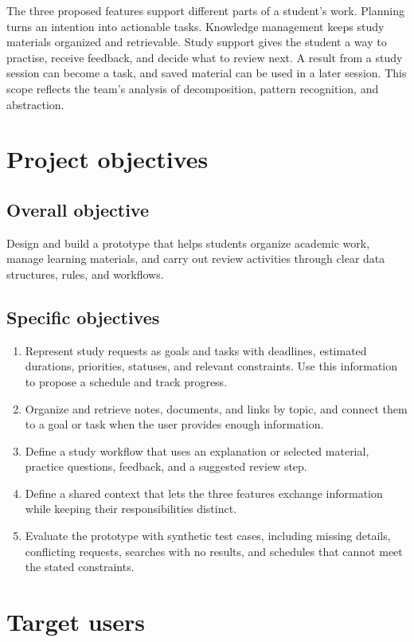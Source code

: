 The three proposed features support different parts of a student's work. Planning turns an intention into actionable tasks. Knowledge management keeps study materials organized and retrievable. Study support gives the student a way to practise, receive feedback, and decide what to review next. A result from a study session can become a task, and saved material can be used in a later session. This scope reflects the team's analysis of decomposition, pattern recognition, and abstraction.

\section{Project objectives}

\subsection*{Overall objective}

Design and build a prototype that helps students organize academic work, manage learning materials, and carry out review activities through clear data structures, rules, and workflows.

\subsection*{Specific objectives}
\begin{enumerate}
  \item Represent study requests as goals and tasks with deadlines, estimated durations, priorities, statuses, and relevant constraints. Use this information to propose a schedule and track progress.
  \item Organize and retrieve notes, documents, and links by topic, and connect them to a goal or task when the user provides enough information.
  \item Define a study workflow that uses an explanation or selected material, practice questions, feedback, and a suggested review step.
  \item Define a shared context that lets the three features exchange information while keeping their responsibilities distinct.
  \item Evaluate the prototype with synthetic test cases, including missing details, conflicting requests, searches with no results, and schedules that cannot meet the stated constraints.
\end{enumerate}

\section{Target users}

